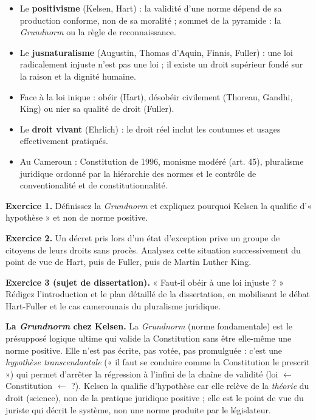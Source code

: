 \documentclass[11pt]{article}
\begin{document}
\begin{aretenir}
\begin{itemize}
\item Le \textbf{positivisme} (Kelsen, Hart) : la validité d'une norme dépend de sa production conforme, non de sa moralité ; sommet de la pyramide : la \emph{Grundnorm} ou la règle de reconnaissance.
\item Le \textbf{jusnaturalisme} (Augustin, Thomas d'Aquin, Finnis, Fuller) : une loi radicalement injuste n'est pas une loi ; il existe un droit supérieur fondé sur la raison et la dignité humaine.
\item Face à la loi inique : obéir (Hart), désobéir civilement (Thoreau, Gandhi, King) ou nier sa qualité de droit (Fuller).
\item Le \textbf{droit vivant} (Ehrlich) : le droit réel inclut les coutumes et usages effectivement pratiqués.
\item Au Cameroun : Constitution de 1996, monisme modéré (art. 45), pluralisme juridique ordonné par la hiérarchie des normes et le contrôle de conventionalité et de constitutionnalité.
\end{itemize}
\end{aretenir}

\begin{exercice}
\textbf{Exercice 1.} Définissez la \emph{Grundnorm} et expliquez pourquoi Kelsen la qualifie d'« hypothèse » et non de norme positive.

\textbf{Exercice 2.} Un décret pris lors d'un état d'exception prive un groupe de citoyens de leurs droits sans procès. Analysez cette situation successivement du point de vue de Hart, puis de Fuller, puis de Martin Luther King.

\textbf{Exercice 3 (sujet de dissertation).} « Faut-il obéir à une loi injuste ? » Rédigez l'introduction et le plan détaillé de la dissertation, en mobilisant le débat Hart-Fuller et le cas camerounais du pluralisme juridique.
\end{exercice}

\begin{corrige}[Exercice 1]
\textbf{La \emph{Grundnorm} chez Kelsen.} La \emph{Grundnorm} (norme fondamentale) est le présupposé logique ultime qui valide la Constitution sans être elle-même une norme positive. Elle n'est pas écrite, pas votée, pas promulguée : c'est une \emph{hypothèse transcendantale} (« il faut se conduire comme la Constitution le prescrit ») qui permet d'arrêter la régression à l'infini de la chaîne de validité (loi $\leftarrow$ Constitution $\leftarrow$ ?). Kelsen la qualifie d'hypothèse car elle relève de la \emph{théorie} du droit (science), non de la pratique juridique positive ; elle est le point de vue du juriste qui décrit le système, non une norme produite par le législateur.
\end{corrige}
\end{document}
